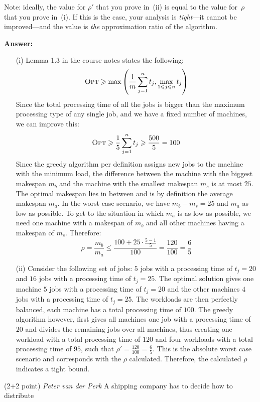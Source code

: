 \documentclass{article}
\renewcommand{\leq}{\leqslant}
\renewcommand{\geq}{\geqslant}
\newcounter{rcounter}
\newenvironment{rlist}%
{\begin{list}{\setnr-\arabic{rcounter}}{\usecounter{rcounter}}}{\end{list}}
\begin{document}
\begin{rlist}
		Note: ideally, the value for $\rho'$ that you prove in~(ii) is equal to the value for~$\rho$ that you prove in~(i). If this is the case, your analysis is \emph{tight}---it cannot be improved---and the value is \emph{the} approximation ratio of the algorithm.
		
		\textbf{Answer:}
		\begin{enumerate}
			\item[(i)]
			Lemma 1.3 in the course notes states the following:
			$$\mbox{\sc Opt} \geq \max \left(\frac{1}{m}\sum_{j=1}^n t_j, \max_{1 \leq j \leq n} t_j\right)$$
			Since the total processing time of all the jobs is bigger than the maximum processing type of any single job, and we have a fixed number of machines, we can improve this:
			$$\mbox{\sc Opt} \geq \frac{1}{5}\sum_{j=1}^n t_j \geq \frac{500}{5} = 100$$
			Since the greedy algorithm per definition assigns new jobs to the machine with the minimum load, the difference between the machine with the biggest makespan $m_b$ and the machine with the smallest makespan $m_s$ is at most $25$. The optimal makespan lies in between and is by definition the average makespan $m_a$. In the worst case scenario, we have $m_b - m_s = 25$ and $m_a$ as low as possible. To get to the situation in which $m_a$ is as low as possible, we need one machine with a makespan of $m_b$ and all other machines having a makespan of $m_s$. Therefore:
			$$\rho = \frac{m_b}{m_a} \leq \frac{100 + 25 \cdot \frac{5-1}{5}}{100} = \frac{120}{100} = \frac{6}{5}$$
			\item[(ii)]
			Consider the following set of jobs: $5$ jobs with a processing time of $t_j = 20$ and $16$ jobs with a processing time of $t_j = 25$. The optimal solution gives one machine $5$ jobs with a processing time of $t_j = 20$ and the other machines $4$ jobs with a processing time of $t_j = 25$. The workloads are then perfectly balanced, each machine has a total processing time of $100$. The greedy algorithm however, first gives all machines one job with a processing time of $20$ and divides the remaining jobs over all machines, thus creating one workload with a total processing time of $120$ and four workloads with a total processing time of $95$, such that $\rho'=\frac{120}{100}=\frac{6}{5}$. This is the absolute worst case scenario and corresponds with the $\rho$ calculated. Therefore, the calculated $\rho$ indicates a tight bound.
		\end{enumerate}
		\item (2+2 point) \textit{Peter van der Perk}
		A shipping company has to decide how to distribute

\end{rlist}
\end{document}
